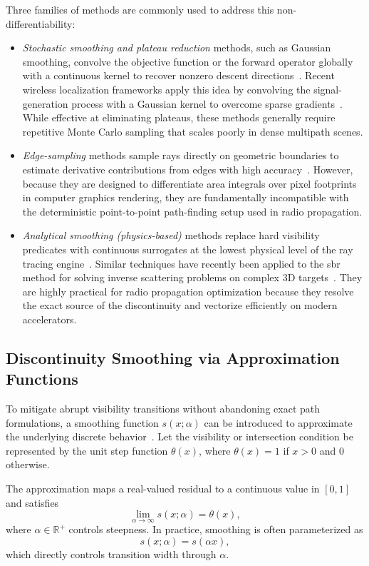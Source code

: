 Three families of methods are commonly used to address this non-differentiability:
\begin{itemize}
  \item \emph{Stochastic smoothing and plateau reduction} methods, such as Gaussian smoothing, convolve the objective function or the forward operator globally with a continuous kernel to recover nonzero descent directions~. Recent wireless localization frameworks apply this idea by convolving the signal-generation process with a Gaussian kernel to overcome sparse gradients~. While effective at eliminating plateaus, these methods generally require repetitive Monte Carlo sampling that scales poorly in dense multipath scenes.
  \item \emph{Edge-sampling} methods sample rays directly on geometric boundaries to estimate derivative contributions from edges with high accuracy~. However, because they are designed to differentiate area integrals over pixel footprints in computer graphics rendering, they are fundamentally incompatible with the deterministic point-to-point path-finding setup used in radio propagation.
  \item \emph{Analytical smoothing (physics-based)} methods replace hard visibility predicates with continuous surrogates at the lowest physical level of the ray tracing engine~. Similar techniques have recently been applied to the \gls{sbr} method for solving inverse scattering problems on complex 3D targets~. They are highly practical for radio propagation optimization because they resolve the exact source of the discontinuity and vectorize efficiently on modern accelerators.
\end{itemize}

\subsection{Discontinuity Smoothing via Approximation Functions}

To mitigate abrupt visibility transitions without abandoning exact path formulations, a smoothing function $s(x;\alpha)$ can be introduced to approximate the underlying discrete behavior~. Let the visibility or intersection condition be represented by the unit step function $\theta(x)$, where $\theta(x)=1$ if $x>0$ and 0 otherwise.

The approximation maps a real-valued residual to a continuous value in $[0,1]$ and satisfies
\begin{equation}
  \lim_{\alpha\rightarrow\infty} s(x;\alpha) = \theta(x),
\end{equation}
where $\alpha\in\mathbb{R}^+$ controls steepness. In practice, smoothing is often parameterized as
\begin{equation}
  s(x;\alpha) = s(\alpha x),
\end{equation}
which directly controls transition width through $\alpha$.

